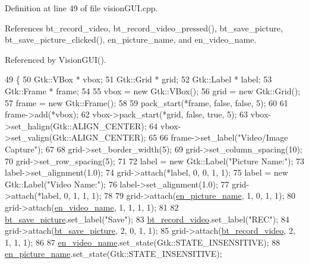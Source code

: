 Definition at line 49 of file vision\+G\+U\+I.\+cpp.



References bt\+\_\+record\+\_\+video, bt\+\_\+record\+\_\+video\+\_\+pressed(), bt\+\_\+save\+\_\+picture, bt\+\_\+save\+\_\+picture\+\_\+clicked(), en\+\_\+picture\+\_\+name, and en\+\_\+video\+\_\+name.



Referenced by Vision\+G\+U\+I().


\begin{DoxyCode}
49                                      \{
50     Gtk::VBox * vbox;
51     Gtk::Grid * grid;
52     Gtk::Label * label;
53     Gtk::Frame * frame;
54 
55     vbox = \textcolor{keyword}{new} Gtk::VBox();
56     grid = \textcolor{keyword}{new} Gtk::Grid();
57     frame = \textcolor{keyword}{new} Gtk::Frame();
58 
59     pack\_start(*frame, \textcolor{keyword}{false}, \textcolor{keyword}{false}, 5);
60 
61     frame->add(*vbox);
62     vbox->pack\_start(*grid, \textcolor{keyword}{false}, \textcolor{keyword}{true}, 5);
63     vbox->set\_halign(Gtk::ALIGN\_CENTER);
64     vbox->set\_valign(Gtk::ALIGN\_CENTER);
65 
66     frame->set\_label(\textcolor{stringliteral}{"Video/Image Capture"});
67 
68     grid->set\_border\_width(5);
69     grid->set\_column\_spacing(10);
70     grid->set\_row\_spacing(5);
71 
72     label = \textcolor{keyword}{new} Gtk::Label(\textcolor{stringliteral}{"Picture Name:"});
73     label->set\_alignment(1.0);
74     grid->attach(*label, 0, 0, 1, 1);
75     label = \textcolor{keyword}{new} Gtk::Label(\textcolor{stringliteral}{"Video Name:"});
76     label->set\_alignment(1.0);
77     grid->attach(*label, 0, 1, 1, 1);
78 
79     grid->attach(\hyperlink{class_vision_g_u_i_aea52285dc471a5611d8170d162ef3210}{en\_picture\_name}, 1, 0, 1, 1);
80     grid->attach(\hyperlink{class_vision_g_u_i_ab09e0f327e58a9d8e10ae343037a3ce2}{en\_video\_name}, 1, 1, 1, 1);
81 
82     \hyperlink{class_vision_g_u_i_afe4bb4a504f404134cc5887e3c352ab4}{bt\_save\_picture}.set\_label(\textcolor{stringliteral}{"Save"});
83     \hyperlink{class_vision_g_u_i_a19751ae6ddc4bef7fcc0edee42820714}{bt\_record\_video}.set\_label(\textcolor{stringliteral}{"REC"});
84     grid->attach(\hyperlink{class_vision_g_u_i_afe4bb4a504f404134cc5887e3c352ab4}{bt\_save\_picture}, 2, 0, 1, 1);
85     grid->attach(\hyperlink{class_vision_g_u_i_a19751ae6ddc4bef7fcc0edee42820714}{bt\_record\_video}, 2, 1, 1, 1);
86 
87     \hyperlink{class_vision_g_u_i_ab09e0f327e58a9d8e10ae343037a3ce2}{en\_video\_name}.set\_state(Gtk::STATE\_INSENSITIVE);
88     \hyperlink{class_vision_g_u_i_aea52285dc471a5611d8170d162ef3210}{en\_picture\_name}.set\_state(Gtk::STATE\_INSENSITIVE);

\end{DoxyCode}
